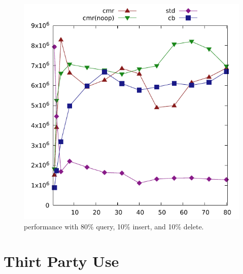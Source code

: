\begin{figure}[ht]
\centering
\includegraphics[width=0.49\linewidth]{graphs/eecs-ath-16-hm-80-10-10.pdf}
\caption{ performance with 80\% query, 10\% insert, and 10\% delete.}
\end{figure}


\section{Thirt Party Use}
\lorem{}

